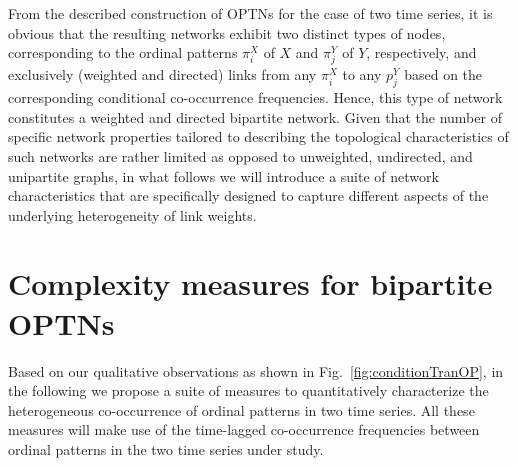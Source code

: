 \documentclass[12pt,aip,cha,reprint,nofootinbib]{revtex4-1}
\begin{document}
From the described construction of OPTNs for the case of two time series, it is obvious that the resulting networks exhibit two distinct types of nodes, corresponding to the ordinal patterns $\pi_i^X$ of $X$ and $\pi_j^Y$ of $Y$, respectively, and exclusively (weighted and directed) links from any $\pi_i^X$ to any $p_j^Y$ based on the corresponding conditional co-occurrence frequencies. Hence, this type of network constitutes a weighted and directed bipartite network. Given that the number of specific network properties tailored to describing the topological characteristics of such networks are rather limited as opposed to unweighted, undirected, and unipartite graphs, in what follows we will introduce a suite of network characteristics that are specifically designed to capture different aspects of the underlying heterogeneity of link weights.

\section{Complexity measures for bipartite OPTNs} \label{sec:measures}

Based on our qualitative observations as shown in Fig.~\ref{fig:conditionTranOP}, in the following we propose a suite of measures to quantitatively characterize the heterogeneous co-occurrence of ordinal patterns in two time series. All these measures will make use of the time-lagged co-occurrence frequencies between ordinal patterns in the two time series under study.
\end{document}
